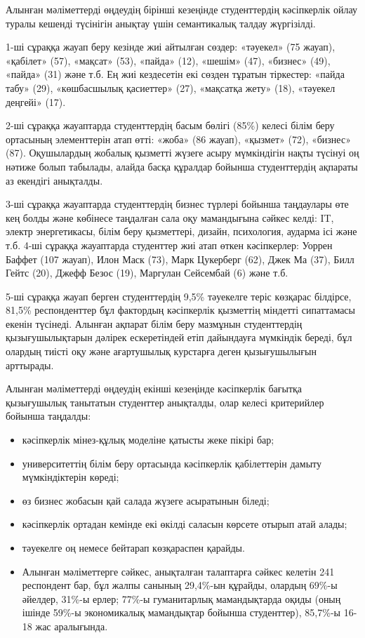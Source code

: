 \begin{multicols}{2}

Алынған мәліметтерді өңдеудің бірінші кезеңінде студенттердің
кәсіпкерлік ойлау туралы кешенді түсінігін анықтау үшін семантикалық
талдау жүргізілді.

1-ші сұраққа жауап беру кезінде жиі айтылған сөздер: «тәуекел» (75
жауап), «қабілет» (57), «мақсат» (53), «пайда» (12), «шешім» (47),
«бизнес» (49), «пайда» (31) және т.б. Ең жиі кездесетін екі сөзден
тұратын тіркестер: «пайда табу» (29), «көшбасшылық қасиеттер» (27),
«мақсатқа жету» (18), «тәуекел деңгейі» (17).

2-ші сұраққа жауаптарда студенттердің басым бөлігі (85\%) келесі білім
беру ортасының элементтерін атап өтті: «жоба» (86 жауап), «қызмет» (72),
«бизнес» (87). Оқушылардың жобалық қызметті жүзеге асыру мүмкіндігін
нақты түсінуі оң нәтиже болып табылады, алайда басқа құралдар бойынша
студенттердің ақпараты аз екендігі анықталды.

3-ші сұраққа жауаптарда студенттердің бизнес түрлері бойынша таңдаулары
өте кең болды және көбінесе таңдалған сала оқу мамандығына сәйкес келді:
IT, электр энергетикасы, білім беру қызметтері, дизайн, психология,
аударма ісі және т.б. 4-ші сұраққа жауаптарда студенттер жиі атап өткен
кәсіпкерлер: Уоррен Баффет (107 жауап), Илон Маск (73), Марк Цукерберг
(62), Джек Ма (37), Билл Гейтс (20), Джефф Безос (19), Маргулан
Сейсембай (6) және т.б.

5-ші сұраққа жауап берген студенттердің 9,5\% тәуекелге теріс көзқарас
білдірсе, 81,5\% респонденттер бұл фактордың кәсіпкерлік қызметтің
міндетті сипаттамасы екенін түсінеді. Алынған ақпарат білім беру
мазмұнын студенттердің қызығушылықтарын дәлірек ескеретіндей етіп
дайындауға мүмкіндік береді, бұл олардың тиісті оқу және ағартушылық
курстарға деген қызығушылығын арттырады.

Алынған мәліметтерді өңдеудің екінші кезеңінде кәсіпкерлік бағытқа
қызығушылық танытатын студенттер анықталды, олар келесі критерийлер
бойынша таңдалды:

\begin{itemize}
\item
  кәсіпкерлік мінез-құлық моделіне қатысты жеке пікірі бар;
\item
  университеттің білім беру ортасында кәсіпкерлік қабілеттерін дамыту
  мүмкіндіктерін көреді;
\item
  өз бизнес жобасын қай салада жүзеге асыратынын біледі;
\item
  кәсіпкерлік ортадан кемінде екі өкілді саласын көрсете отырып атай
  алады;
\item
  тәуекелге оң немесе бейтарап көзқараспен қарайды.
\item
  Алынған мәліметтерге сәйкес, анықталған талаптарға сәйкес келетін 241
  респондент бар, бұл жалпы санының 29,4\%-ын құрайды, олардың 69\%-ы
  әйелдер, 31\%-ы ерлер; 77\%-ы гуманитарлық мамандықтарда оқиды (оның
  ішінде 59\%-ы экономикалық мамандықтар бойынша студенттер), 85,7\%-ы
  16-18 жас аралығында.
\end{itemize}


\end{multicols}
